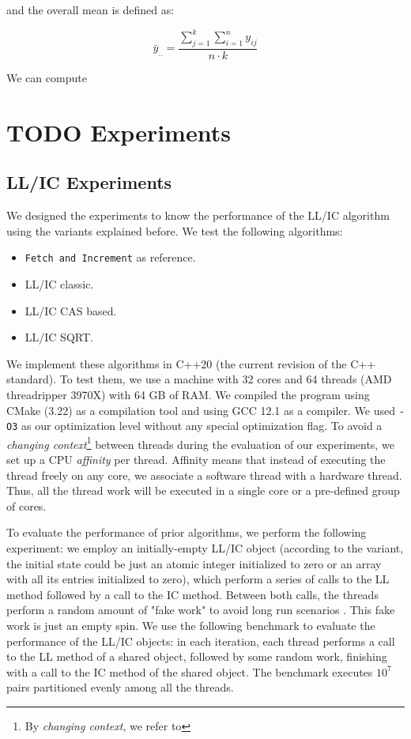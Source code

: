 \documentclass{latex/classes/thesis}
\begin{document}
and the overall mean is defined as:

\begin{equation}
  \bar{y}_{..} = \frac{\sum^k_{j = 1}\sum^n_{i = 1}y_{ij}}{n\cdot{}k}
\end{equation}

We can compute


\section{{\bfseries\sffamily TODO} Experiments}
\label{sec:org69acb16}

\subsection{LL/IC Experiments}
\label{sec:org629247d}

We designed the experiments to know the performance of the LL/IC algorithm
using the variants explained before. We test the following algorithms:

\begin{itemize}
\item \texttt{Fetch and Increment} as reference.
\item LL/IC classic.
\item LL/IC CAS based.
\item LL/IC SQRT.
\end{itemize}

We implement these algorithms in C++20 (the current revision of the C++
standard). To test them, we use a machine with 32 cores and 64 threads (AMD
threadripper 3970X) with 64 GB of RAM. We compiled the program using CMake
(3.22) as a compilation tool and using GCC 12.1 as a compiler. We used \texttt{-O3} as
our optimization level without any special optimization flag. To avoid a
\emph{changing context}\footnote{By \emph{changing context}, we refer to} between threads during the evaluation of our
experiments, we set up a CPU \emph{affinity} per thread. Affinity means that instead
of executing the thread freely on any core, we associate a software thread
with a hardware thread. Thus, all the thread work will be executed in a
single core or a pre-defined group of cores.

To evaluate the performance of prior algorithms, we perform the following
experiment: we employ an initially-empty LL/IC object (according to the
variant, the initial state could be just an atomic integer initialized to
zero or an array with all its entries initialized to zero), which perform a
series of calls to the LL method followed by a call to the IC method. Between
both calls, the threads perform a random amount of "fake work" to avoid long
run scenarios
\cite{DBLP_conf_ppopp_YangM16,DBLP_conf_podc_MichaelS96}. This fake work
is just an empty spin. We use the following benchmark to evaluate the
performance of the LL/IC objects: in each iteration, each thread performs a
call to the LL method of a shared object, followed by some random work,
finishing with a call to the IC method of the shared object. The benchmark
executes \(10^7\) pairs partitioned evenly among all the threads.
\end{document}
